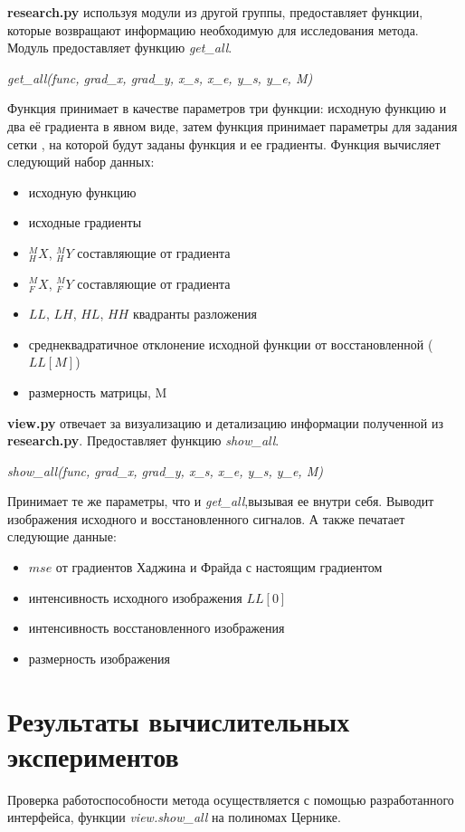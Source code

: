 \documentclass[oneside, final, 14pt]{article}
\begin{document}
\textbf{research.py} используя модули из другой группы, предоставляет функции, которые возвращают информацию необходимую для исследования метода. Модуль предоставляет функцию \textit{get\_all}.

\textit{get\_all(func, grad\_x, grad\_y, x\_s, x\_e, y\_s, y\_e, M)}

Функция принимает в качестве параметров три функции: исходную функцию и два её градиента в явном виде, затем функция принимает параметры для задания сетки , на которой будут заданы функция и ее градиенты. Функция вычисляет следующий набор данных:
\begin{itemize}
\item исходную функцию
\item исходные градиенты
\item $_H^MX$, $_H^MY$ составляющие от градиента
\item $_F^MX$, $_F^MY$ составляющие от градиента
\item $LL$, $LH$, $HL$, $HH$ квадранты разложения
\item среднеквадратичное отклонение исходной функции от восстановленной ($LL[M]$)
\item размерность матрицы, M
\end{itemize}

\textbf{view.py} отвечает за визуализацию и детализацию информации полученной из \textbf{research.py}. Предоставляет функцию \textit{show\_all}.

\textit{show\_all(func, grad\_x, grad\_y, x\_s, x\_e, y\_s, y\_e, M)}

Принимает те же параметры, что и \textit{get\_all},вызывая ее внутри себя. Выводит изображения исходного и восстановленного сигналов. А также печатает следующие данные:
\begin{itemize}
\item $mse$ от градиентов Хаджина и Фрайда с настоящим градиентом
\item интенсивность исходного изображения $LL[0]$
\item интенсивность восстановленного изображения 
\item размерность изображения
\end{itemize}

\newpage
\section{Результаты вычислительных экспериментов}
Проверка работоспособности метода осуществляется с помощью разработанного интерфейса, функции \textit{view.show\_all} на полиномах Цернике.
\end{document}
